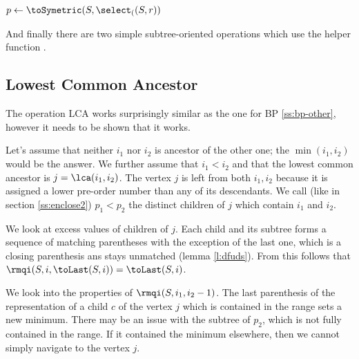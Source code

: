 \begin{algorithmic}
		\State {}
	\Else
		\State $p \gets \toSymetric(S, \select_((S, r))$
		\State {}
	\EndIf
\EndFunction
\end{algorithmic}

And finally there are two simple subtree-oriented operations which use the helper function \toLast{}.

\begin{algorithmic}
		\State {}
	\Else
		\State {}
	\EndIf
\EndFunction
\end{algorithmic}

\begin{algorithmic}
		\State {}
	\Else
		\State {}
	\EndIf
\EndFunction
\end{algorithmic}

\subsection{Lowest Common Ancestor}

The operation LCA works surprisingly similar as the one for BP \ref{ss:bp-other}, however it needs to be shown that it works.

Let's assume that neither $i_1$ nor $i_2$ is ancestor of the other one; the $\min(i_1, i_2)$ would be the answer.
We further assume that $i_1 < i_2$ and that the lowest common ancestor is $j = \lca(i_1, i_2)$.
The vertex $j$ is left from both $i_1, i_2$ because it is assigned a lower pre-order number than any of its descendants.
We call (like in section \ref{ss:enclose2}) $p_1 < p_2$ the distinct children of $j$ which contain $i_1$ and $i_2$.

We look at excess values of children of $j$.
Each child and its subtree forms a sequence of matching parentheses with the exception of the last one, which is a closing parenthesis ans stays unmatched (lemma \ref{l:dfuds}).
From this follows that $\rmqi(S, i, \toLast(S, i)) = \toLast(S, i)$.

We look into the properties of $\rmqi(S, i_1, i_2 - 1)$.
The last parenthesis of the representation of a child $c$ of the vertex $j$ which is contained in the range sets a new minimum.
There may be an issue with the subtree of $p_2$, which is not fully contained in the range.
If it contained the minimum elsewhere, then we cannot simply navigate to the vertex $j$.

